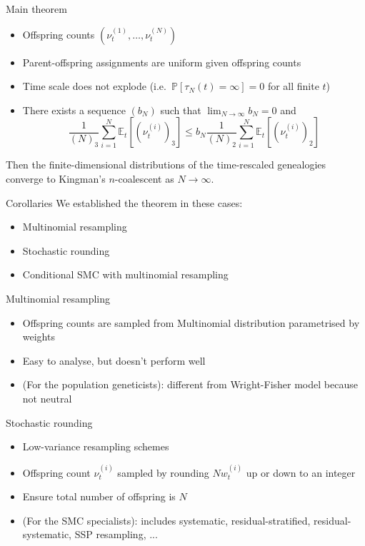 \documentclass[aspectratio=169]{beamer}
\theoremstyle{definition}
\newcommand{\PR}{\mathbb{P}}
\newcommand{\E}{\mathbb{E}}
\newcommand{\vt}[2][t]{\nu_{#1}^{(#2)}}
\newcommand{\wt}[2][t]{w_{#1}^{(#2)}}
\begin{document}
\begin{frame}{Main theorem}
\begin{itemize}
\item Offspring counts $(\vt{1},\dots,\vt{N})$
\pause
\item Parent-offspring assignments are uniform given offspring counts
\item Time scale does not explode (i.e.\ $\PR[\tau_N(t)=\infty]=0$ for all finite $t$)
\item There exists a sequence $(b_N)$ such that $\lim_{N\to\infty} b_N = 0$ and
\begin{equation*}
\frac{1}{(N)_3} \sum_{i=1}^N \E_t [ (\vt{i})_3 ]
\leq b_N \frac{1}{(N)_2} \sum_{i=1}^N \E_t [ (\vt{i})_2 ]
\end{equation*}
\end{itemize}
\pause
Then the finite-dimensional distributions of the time-rescaled genealogies converge to Kingman's $n$-coalescent as $N\to\infty$.
\end{frame}


\begin{frame}{Corollaries}
We established the theorem in these cases:
\begin{itemize}
\item Multinomial resampling
\item Stochastic rounding 
\item Conditional SMC with multinomial resampling
\end{itemize}
\end{frame}


\begin{frame}{Multinomial resampling}
\begin{itemize}
\item Offspring counts are sampled from Multinomial distribution parametrised by weights
\item Easy to analyse, but doesn't perform well
\item (For the population geneticists): different from Wright-Fisher model because not neutral
\end{itemize}
\end{frame}


\begin{frame}{Stochastic rounding}
\begin{itemize}
\item Low-variance resampling schemes
\item Offspring count $\vt{i}$ sampled by rounding $N \wt{i}$ up or down to an integer
\item Ensure total number of offspring is $N$
\item (For the SMC specialists): includes systematic, residual-stratified, residual-systematic, SSP resampling, ...
\end{itemize}
\end{frame}
\end{document}
